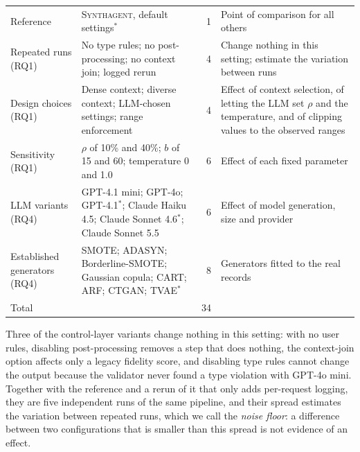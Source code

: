 \documentclass[conference]{IEEEtran}
\newcommand{\system}{\textsc{Synthagent}\xspace}
\providecommand{\DIFaddendFL}{} %
\DeclareRobustCommand{\DIFaddendFL}{\DIFOaddendFL \let\includegraphics\DIFOincludegraphics} %
\begin{document}
\begin{table}[t]
\begin{tabular}{@{}p{}p{}r@{\hspace{4pt}}p{}@{}}
Reference & \system, default settings$^{\ast}$ & 1 & Point of comparison for all others \\
Repeated runs (RQ1) & No type rules; no post-processing; no context join; logged rerun & 4 & Change nothing in this setting; estimate the variation between runs \\
Design choices (RQ1) & Dense context; diverse context; LLM-chosen settings; range enforcement & 4 & Effect of context selection, of letting the LLM set $\rho$ and the temperature, and of clipping values to the observed ranges \\
Sensitivity (RQ1) & $\rho$ of 10\% and 40\%; $b$ of 15 and 60; temperature 0 and 1.0 & 6 & Effect of each fixed parameter \\
LLM variants (RQ4) & GPT-4.1 mini; GPT-4o; GPT-4.1$^{\ast}$; Claude Haiku 4.5; Claude Sonnet 4.6$^{\ast}$; Claude Sonnet 5.5 & 6 & Effect of model generation, size and provider \\
Established generators (RQ4) & SMOTE; ADASYN; Borderline-SMOTE; Gaussian copula; CART; ARF; CTGAN; TVAE$^{\ast}$ & 8 & Generators fitted to the real records \\
\midrule
Total & & 34 & \\
\bottomrule
\end{tabular}
\DIFaddendFL \end{table}

Three of the control-layer variants change nothing in this setting: with no user rules, disabling post-processing removes a step that does nothing, the context-join option affects only a legacy fidelity score, and disabling type rules cannot change the output because the validator never found a type violation with GPT-4o mini. Together with the reference and a rerun of it that only adds per-request logging, they are five independent runs of the same pipeline, and their spread estimates the variation between repeated runs, which we call the \emph{noise floor}: a difference between two configurations that is smaller than this spread is not evidence of an effect.
\end{document}
